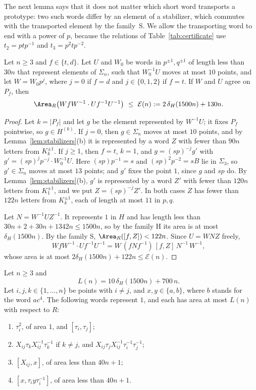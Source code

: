The next lemma says that it does not matter which short word transports a prototype: two such words differ by an element of a stabilizer,
which commutes with the transported element by the family~\textsf{S}. We allow the transporting word to end with a power of $p$, because the
relations of Table~\ref{tab:certificate} use $t_2=ptp^{-1}$ and $t_3=p^2tp^{-2}$.

\begin{lemma}\label{lem:exchange}
Let $n\ge3$ and $f\in\{t,d\}$. Let $U$ and $W_0$ be words in $p^{\pm1},q^{\pm1}$ of length less than $30n$ that represent elements of $\Sigma_n$,
such that $W_0^{-1}U$ moves at most $10$ points, and let $W=W_0p^j$, where $j=0$ if $f=d$ and $j\in\{0,1,2\}$ if $f=t$. If $W$ and $U$ agree
on $P_f$, then
\[
\Area_R\bigl(WfW^{-1}\cdot Uf^{-1}U^{-1}\bigr)\ \le\ \mathcal E(n):=2\,\delta_H(1500n)+130n .
\]
\end{lemma}

\begin{proof}
Let $k=|P_f|$ and let $g$ be the element represented by $W^{-1}U$; it fixes $P_f$ pointwise, so $g\in H^{(k)}$. If $j=0$, then $g\in\Sigma_n$ moves at
most $10$ points, and by Lemma~\ref{lem:stabilizers}(b) it is represented by a word $Z$ with fewer than $90n$ letters from $K_k^{\pm1}$. If
$j\ge1$, then $f=t$, $k=1$, and $g=(sp)^{-j}g'$ with $g'=(sp)^jp^{-j}\cdot W_0^{-1}U$. Here $(sp)p^{-1}=s$ and $(sp)^2p^{-2}=sB$ lie in
$\Sigma_3$, so $g'\in\Sigma_n$ moves at most $13$ points; and $g'$ fixes the point $1$, since $g$ and $sp$ do. By Lemma~\ref{lem:stabilizers}(b),
$g'$ is represented by a word $Z'$ with fewer than $120n$ letters from $K_1^{\pm1}$, and we put $Z=(sp)^{-j}Z'$. In both cases $Z$ has fewer than
$122n$ letters from $K_k^{\pm1}$, each of length at most $11$ in $p,q$.

Let $N=W^{-1}UZ^{-1}$. It represents $1$ in $H$ and has length less than $30n+2+30n+1342n\le1500n$, so by the family \textsf{H} its area is at
most $\delta_H(1500n)$. By the family \textsf{S}, $\Area_R([f,Z])<122n$. Since $U=WNZ$ freely,
\[
WfW^{-1}\cdot Uf^{-1}U^{-1}=W\,(fNf^{-1})\,[f,Z]\,N^{-1}\,W^{-1},
\]
whose area is at most $2\delta_H(1500n)+122n\le\mathcal E(n)$.
\end{proof}

\begin{lemma}\label{lem:local-filling}
Let $n\ge3$ and
\[
L(n)=10\,\delta_H(1500n)+700\,n .
\]
Let $i,j,k\in\{1,\dots,n\}$ be points with $i\ne j$, and $x,y\in\{a,b\}$, where $b$ stands for the word $ac^4$. The following words represent $1$,
and each has area at most $L(n)$ with respect to $R$:
\begin{enumerate}[label=(\alph*),itemsep=1pt]
\item $\tau_i^2$, of area $1$, and $[\tau_i,\tau_j]$;
\item $X_{ij}\tau_kX_{ij}^{-1}\tau_k^{-1}$ if $k\ne j$, and $X_{ij}\tau_jX_{ij}^{-1}\tau_i^{-1}\tau_j^{-1}$;
\item $[X_{ij},x]$, of area less than $40n+1$;
\item $[x,\tau_iy\tau_i^{-1}]$, of area less than $40n+1$.
\end{enumerate}
\end{lemma}

